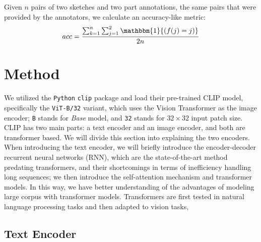 Given $n$ pairs of two sketches and two part annotations, the same pairs that were provided by the annotators, we calculate an accuracy-like metric:
$$ acc = \frac{\sum_{k=1}^{n} \sum_{j=1}^2 \mathbbm{1}{(f(j) = j)}}{2n} $$

\section{Method}

We utilized the \texttt{Python} \texttt{clip} package and load their pre-trained CLIP model, specifically the \texttt{ViT-B/32} variant, which uses the Vision Transformer \citep{visiontransformer} as the image encoder; \texttt{B} stands for \textit{Base} model, and \texttt{32} stands for $32 \times 32$ input patch size. CLIP has two main parts: a text encoder and an image encoder, and both are transformer based. We will divide this section into explaining the two encoders. When introducing the text encoder, we will briefly introduce the encoder-decoder recurrent neural networks (RNN), which are the state-of-the-art method predating transformers, and their shortcomings in terms of inefficiency handling long sequences; we then introduce the self-attention mechanism and transformer models. In this way, we have better understanding of the advantages of modeling large corpus with transformer models. 
Transformers are first tested in natural language processing tasks and then adapted to vision tasks, 

\subsection{Text Encoder}

